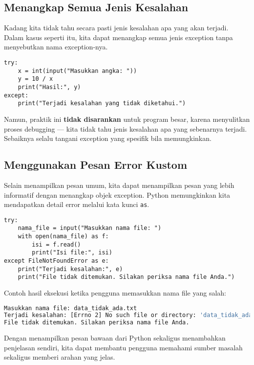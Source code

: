 \subsection*{Menangkap Semua Jenis Kesalahan}

Kadang kita tidak tahu secara pasti jenis kesalahan apa yang akan terjadi. Dalam kasus seperti itu, kita dapat menangkap semua jenis exception tanpa menyebutkan nama exception-nya.

\begin{lstlisting}[style=PythonStyle, caption={Menangkap semua jenis exception}]
try:
    x = int(input("Masukkan angka: "))
    y = 10 / x
    print("Hasil:", y)
except:
    print("Terjadi kesalahan yang tidak diketahui.")
\end{lstlisting}

Namun, praktik ini \textbf{tidak disarankan} untuk program besar, karena menyulitkan proses debugging — kita tidak tahu jenis kesalahan apa yang sebenarnya terjadi. Sebaiknya selalu tangani exception yang spesifik bila memungkinkan.

\subsection*{Menggunakan Pesan Error Kustom}

Selain menampilkan pesan umum, kita dapat menampilkan pesan yang lebih informatif dengan menangkap objek exception. Python memungkinkan kita mendapatkan detail error melalui kata kunci \texttt{as}.

\begin{lstlisting}[style=PythonStyle, caption={Penggunaan pesan error kustom}]
try:
    nama_file = input("Masukkan nama file: ")
    with open(nama_file) as f:
        isi = f.read()
        print("Isi file:", isi)
except FileNotFoundError as e:
    print("Terjadi kesalahan:", e)
    print("File tidak ditemukan. Silakan periksa nama file Anda.")
\end{lstlisting}

Contoh hasil eksekusi ketika pengguna memasukkan nama file yang salah:

\begin{lstlisting}[language=bash]
Masukkan nama file: data_tidak_ada.txt
Terjadi kesalahan: [Errno 2] No such file or directory: 'data_tidak_ada.txt'
File tidak ditemukan. Silakan periksa nama file Anda.
\end{lstlisting}

Dengan menampilkan pesan bawaan dari Python sekaligus menambahkan penjelasan sendiri, kita dapat membantu pengguna memahami sumber masalah sekaligus memberi arahan yang jelas.

